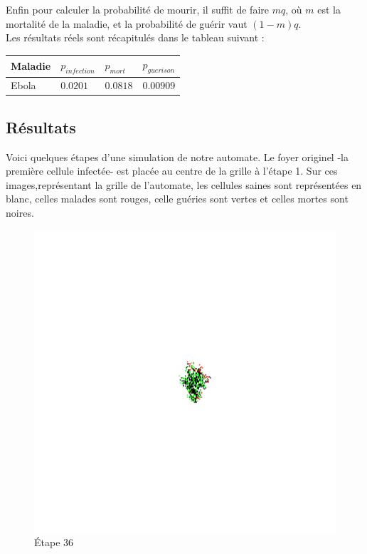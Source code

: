 \documentclass{article}
\begin{document}
Enfin pour calculer la probabilité de mourir, il suffit de faire $mq$, où $m$ est la mortalité de la maladie, et la probabilité de guérir vaut $(1-m)q$. \\
Les résultats réels sont récapitulés dans le tableau suivant :

\begin{tabular} {| p{2cm} | p{2cm}| p{2cm} | p{2cm} |}
	\hline
	Maladie & $p_{infection}$ & $p_{mort}$ & $p_{guerison}$ \\ \hline
	Ebola & $0.0201$ & $0.0818$ & $0.00909$ \\
	\hline
\end{tabular}

\subsection{Résultats}

Voici quelques étapes d'une simulation de notre automate. Le foyer originel -la première cellule infectée- est placée au centre de la grille à l'étape 1. Sur ces images,représentant la grille de l'automate, les cellules saines sont représentées en blanc, celles malades sont rouges, celle guéries sont vertes et celles mortes sont noires.

\begin{figure}[hbtp]
\centering
\includegraphics[scale=0.22]{Frame-36.png}
\caption{Étape 36}
\end{figure}
\end{document}
